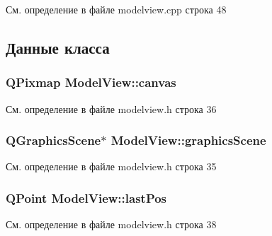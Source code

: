 См. определение в файле modelview.\+cpp строка 48



\subsection{Данные класса}
\subsubsection[{\texorpdfstring{canvas}{canvas}}]{\setlength{\rightskip}{0pt plus 5cm}Q\+Pixmap Model\+View\+::canvas\hspace{0.3cm}{\ttfamily [private]}}\hypertarget{class_model_view_aa428aaa80cb804090b372c39e1c87044}{}\label{class_model_view_aa428aaa80cb804090b372c39e1c87044}


См. определение в файле modelview.\+h строка 36

\subsubsection[{\texorpdfstring{graphics\+Scene}{graphicsScene}}]{\setlength{\rightskip}{0pt plus 5cm}Q\+Graphics\+Scene$\ast$ Model\+View\+::graphics\+Scene\hspace{0.3cm}{\ttfamily [private]}}\hypertarget{class_model_view_ae6374117c710be500a33e57e3561ac8f}{}\label{class_model_view_ae6374117c710be500a33e57e3561ac8f}


См. определение в файле modelview.\+h строка 35

\subsubsection[{\texorpdfstring{last\+Pos}{lastPos}}]{\setlength{\rightskip}{0pt plus 5cm}Q\+Point Model\+View\+::last\+Pos\hspace{0.3cm}{\ttfamily [private]}}\hypertarget{class_model_view_a02ee08144e27ff6f19d1e26a52cebb87}{}\label{class_model_view_a02ee08144e27ff6f19d1e26a52cebb87}


См. определение в файле modelview.\+h строка 38

